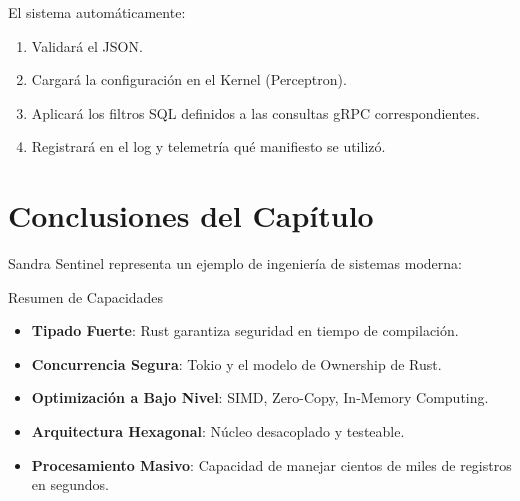 El sistema automáticamente:

\begin{enumerate}
\item Validará el JSON.
\item Cargará la configuración en el Kernel (Perceptron).
\item Aplicará los filtros SQL definidos a las consultas gRPC correspondientes.
\item Registrará en el log y telemetría qué manifiesto se utilizó.
\end{enumerate}


\section{Conclusiones del Capítulo}

Sandra Sentinel representa un ejemplo de ingeniería de sistemas moderna:

\begin{caja}{Resumen de Capacidades}
\begin{itemize}
\item \textbf{Tipado Fuerte}: Rust garantiza seguridad en tiempo de compilación.
\item \textbf{Concurrencia Segura}: Tokio y el modelo de Ownership de Rust.
\item \textbf{Optimización a Bajo Nivel}: SIMD, Zero-Copy, In-Memory Computing.
\item \textbf{Arquitectura Hexagonal}: Núcleo desacoplado y testeable.
\item \textbf{Procesamiento Masivo}: Capacidad de manejar cientos de miles de registros en segundos.
\end{itemize}
\end{caja}

